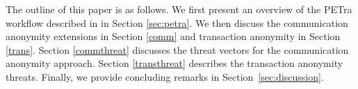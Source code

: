
The outline of this paper is as follows. We first present an overview of the PETra workflow described in \cite{Laszka17} in Section \ref{sec:petra}. We then discuss the communication anonymity extensions in Section \ref{comm} and transaction anonymity in Section \ref{trans}. Section \ref{commthreat} discusses the threat vectors for the communication anonymity approach. Section \ref{transthreat} describes the transaction anonymity threats.
Finally, we provide concluding remarks in Section~\ref{sec:discussion}.